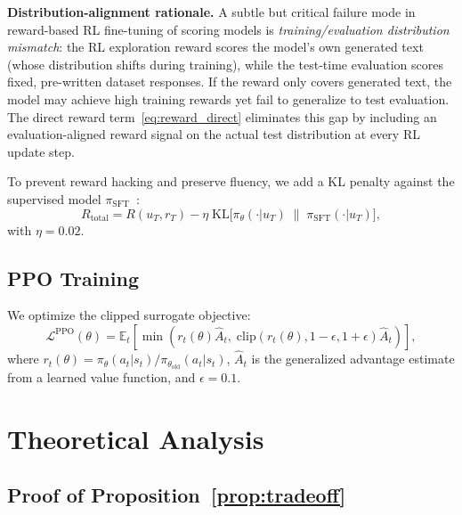 \documentclass[lettersize,journal]{IEEEtran}
\begin{document}
\textbf{Distribution-alignment rationale.}  A subtle but critical failure
mode in reward-based RL fine-tuning of scoring models is \emph{training/evaluation
distribution mismatch}: the RL exploration reward scores the model's own
generated text (whose distribution shifts during training), while the test-time
evaluation scores fixed, pre-written dataset responses.  If the reward only
covers generated text, the model may achieve high training rewards yet fail to
generalize to test evaluation.  The direct reward term~\eqref{eq:reward_direct}
eliminates this gap by including an evaluation-aligned reward signal on the
actual test distribution at every RL update step.

To prevent reward hacking and preserve fluency, we add a KL penalty against
the supervised model $\pi_\mathrm{SFT}$~\cite{ouyang2022instructgpt}:
\begin{equation}
R_\mathrm{total}
  = R(u_T, r_T)
  - \eta\;\mathrm{KL}\!\bigl[
      \pi_\theta(\cdot|u_T)
      \;\|\;
      \pi_\mathrm{SFT}(\cdot|u_T)\bigr],
\end{equation}
with $\eta{=}0.02$.

\subsection{PPO Training}

We optimize the clipped surrogate objective:
\begin{equation}
\mathcal{L}^\mathrm{PPO}(\theta)
  = \mathbb{E}_t\!\left[
      \min\!\left(
        r_t(\theta)\hat{A}_t,\;
        \mathrm{clip}(r_t(\theta),1{-}\epsilon,1{+}\epsilon)\hat{A}_t
      \right)
    \right],
\end{equation}
where $r_t(\theta)=\pi_\theta(a_t|s_t)/\pi_{\theta_\mathrm{old}}(a_t|s_t)$,
$\hat{A}_t$ is the generalized advantage estimate from a learned value
function, and $\epsilon{=}0.1$.

\section{Theoretical Analysis}
\label{sec:theory}

\subsection{Proof of Proposition~\ref{prop:tradeoff}}
\end{document}
